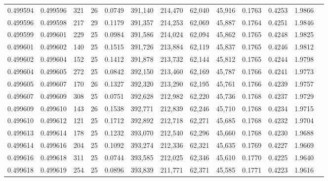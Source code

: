 \begin{tabular}{rrrrrrrrrrrrr}
0.499594 & 0.499596 & 321 &  26 &                                     0.0749 & 391,140 & 214,470 &  62,040 &  45,916 & 0.1763 & 0.4253 & 1.9866 \\
0.499596 & 0.499598 & 217 &  29 &                                     0.1179 & 391,357 & 214,253 &  62,069 &  45,887 & 0.1764 & 0.4251 & 1.9846 \\
0.499599 & 0.499601 & 229 &  25 &                                     0.0984 & 391,586 & 214,024 &  62,094 &  45,862 & 0.1765 & 0.4248 & 1.9825 \\
0.499601 & 0.499602 & 140 &  25 &                                     0.1515 & 391,726 & 213,884 &  62,119 &  45,837 & 0.1765 & 0.4246 & 1.9812 \\
0.499602 & 0.499604 & 152 &  25 &                                     0.1412 & 391,878 & 213,732 &  62,144 &  45,812 & 0.1765 & 0.4244 & 1.9798 \\
0.499604 & 0.499605 & 272 &  25 &                                     0.0842 & 392,150 & 213,460 &  62,169 &  45,787 & 0.1766 & 0.4241 & 1.9773 \\
0.499605 & 0.499607 & 170 &  26 &                                     0.1327 & 392,320 & 213,290 &  62,195 &  45,761 & 0.1766 & 0.4239 & 1.9757 \\
0.499607 & 0.499609 & 308 &  25 &                                     0.0751 & 392,628 & 212,982 &  62,220 &  45,736 & 0.1768 & 0.4237 & 1.9729 \\
0.499609 & 0.499610 & 143 &  26 &                                     0.1538 & 392,771 & 212,839 &  62,246 &  45,710 & 0.1768 & 0.4234 & 1.9715 \\
0.499610 & 0.499612 & 121 &  25 &                                     0.1712 & 392,892 & 212,718 &  62,271 &  45,685 & 0.1768 & 0.4232 & 1.9704 \\
0.499613 & 0.499614 & 178 &  25 &                                     0.1232 & 393,070 & 212,540 &  62,296 &  45,660 & 0.1768 & 0.4230 & 1.9688 \\
0.499614 & 0.499616 & 204 &  25 &                                     0.1092 & 393,274 & 212,336 &  62,321 &  45,635 & 0.1769 & 0.4227 & 1.9669 \\
0.499616 & 0.499618 & 311 &  25 &                                     0.0744 & 393,585 & 212,025 &  62,346 &  45,610 & 0.1770 & 0.4225 & 1.9640 \\
0.499618 & 0.499619 & 254 &  25 &                                     0.0896 & 393,839 & 211,771 &  62,371 &  45,585 & 0.1771 & 0.4223 & 1.9616 \\

\end{tabular}
